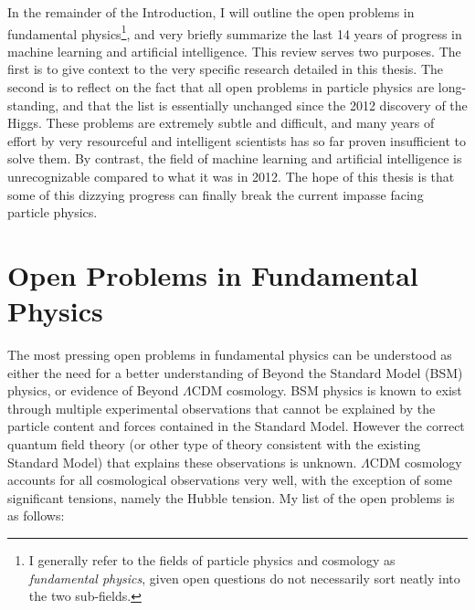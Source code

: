 In the remainder of the Introduction, I will outline the open problems in fundamental physics\footnote{I generally refer to the fields of particle physics and cosmology as \textit{fundamental physics}, given open questions do not necessarily sort neatly into the two sub-fields.}, and very briefly summarize the last 14 years of progress in machine learning and artificial intelligence.
This review serves two purposes.
The first is to give context to the very specific research detailed in this thesis.
The second is to reflect on the fact that all open problems in particle physics are long-standing, and that the list is essentially unchanged since the 2012 discovery of the Higgs.
These problems are extremely subtle and difficult, and many years of effort by very resourceful and intelligent scientists has so far proven insufficient to solve them.
By contrast, the field of machine learning and artificial intelligence is unrecognizable compared to what it was in 2012.
The hope of this thesis is that some of this dizzying progress can finally break the current impasse facing particle physics.


\section{Open Problems in Fundamental Physics}
\label{sec:open_problems}

The most pressing open problems in fundamental physics can be understood as either the need for a better understanding of Beyond the Standard Model (BSM) physics, or evidence of Beyond $\Lambda$CDM cosmology.
BSM physics is known to exist through multiple experimental observations that cannot be explained by the particle content and forces contained in the Standard Model.
However the correct quantum field theory (or other type of theory consistent with the existing Standard Model) that explains these observations is unknown.
$\Lambda$CDM cosmology accounts for all cosmological observations very well, with the exception of some significant tensions, namely the Hubble tension.
My list of the open problems is as follows:


